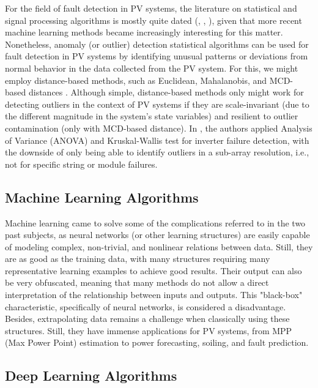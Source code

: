 
For the field of fault detection in PV systems, the literature on statistical and signal processing algorithms is mostly quite dated (\cite{Buddha2012}, \cite{Zhao2014}, \cite{Vergura2008}), given that more recent machine learning methods became increasingly interesting for this matter. Nonetheless, anomaly (or outlier) detection statistical algorithms can be used for fault detection in PV systems by identifying unusual patterns or deviations from normal behavior in the data collected from the PV system. For this, we might employ distance-based methods, such as Euclidean, Mahalanobis, and MCD-based distances \cite{Braun2011}. Although simple, distance-based methods only might work for detecting outliers in the context of PV systems if they are scale-invariant (due to the different magnitude in the system's state variables) and resilient to outlier contamination (only with MCD-based distance). In  \cite{Vergura2008}, the authors applied Analysis of Variance (ANOVA) and Kruskal-Wallis test for inverter failure detection, with the downside of only being able to identify outliers in a sub-array resolution, i.e., not for specific string or module failures.


\subsection{Machine Learning Algorithms}

Machine learning came to solve some of the complications referred to in the two past subjects, as neural networks (or other learning structures) are easily capable of modeling complex, non-trivial, and nonlinear relations between data. Still, they are as good as the training data, with many structures requiring many representative learning examples to achieve good results. Their output can also be very obfuscated, meaning that many methods do not allow a direct interpretation of the relationship between inputs and outputs. This "black-box" characteristic, specifically of neural networks, is considered a disadvantage. Besides, extrapolating data remains a challenge when classically using these structures. Still, they have immense applications for PV systems, from MPP (Max Power Point) estimation to power forecasting, soiling, and fault prediction.

\subsection{Deep Learning Algorithms}

